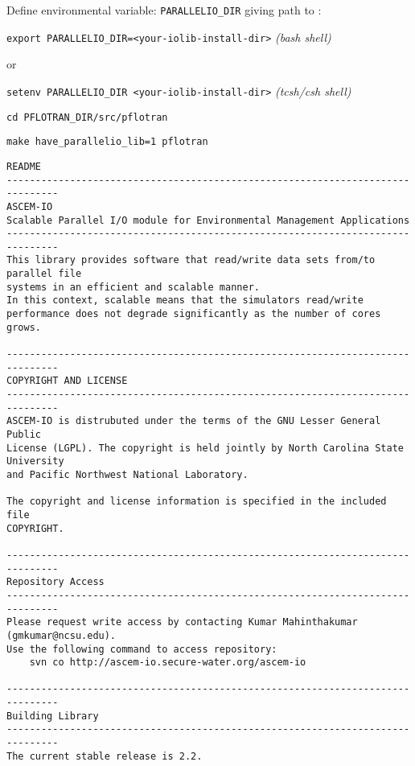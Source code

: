\begin{enumerate}
Define environmental variable: {\footnotesize\tt PARALLELIO\_DIR} giving path to :

\footnotesize
{\tt export PARALLELIO\_DIR=<your-iolib-install-dir>} \hfill {\it (bash shell)}
\normalsize

or

\footnotesize
{\tt setenv PARALLELIO\_DIR <your-iolib-install-dir>} \hfill {\it (tcsh/csh shell)}

{\tt cd PFLOTRAN\_DIR/src/pflotran}

{\tt make have\_parallelio\_lib=1 pflotran}
\normalsize
\end{enumerate}

\scriptsize
\begin{verbatim}
README
-------------------------------------------------------------------------------
ASCEM-IO
Scalable Parallel I/O module for Environmental Management Applications
-------------------------------------------------------------------------------
This library provides software that read/write data sets from/to parallel file 
systems in an efficient and scalable manner. 
In this context, scalable means that the simulators read/write 
performance does not degrade significantly as the number of cores grows.

-------------------------------------------------------------------------------
COPYRIGHT AND LICENSE 
-------------------------------------------------------------------------------
ASCEM-IO is distrubuted under the terms of the GNU Lesser General Public 
License (LGPL). The copyright is held jointly by North Carolina State University 
and Pacific Northwest National Laboratory. 

The copyright and license information is specified in the included file 
COPYRIGHT. 

-------------------------------------------------------------------------------
Repository Access
-------------------------------------------------------------------------------
Please request write access by contacting Kumar Mahinthakumar (gmkumar@ncsu.edu). 
Use the following command to access repository:
	svn co http://ascem-io.secure-water.org/ascem-io

-------------------------------------------------------------------------------
Building Library
-------------------------------------------------------------------------------
The current stable release is 2.2.


\end{verbatim}
